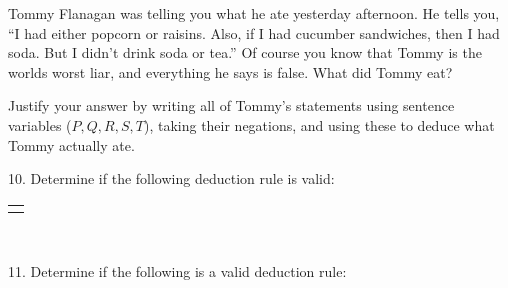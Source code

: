 \documentclass[12pt,]{book}
\theoremstyle{plain}
\theoremstyle{definition}
\theoremstyle{definition}
\theoremstyle{definition}
\numberwithin{equation}{chapter}
\newcommand{\hrulethin}  {\noalign{\hrule height 0.04em}}
\newlength{\panelmax}
\begin{document}
\begin{exerciselist}
Tommy Flanagan was telling you what he ate yesterday afternoon. He tells you, ``I had either popcorn or raisins. Also, if I had cucumber sandwiches, then I had soda. But I didn't drink soda or tea.'' Of course you know that Tommy is the worlds worst liar, and everything he says is false. What did Tommy eat?%
\par
\hypertarget{p-1288}{}%
Justify your answer by writing all of Tommy's statements using sentence variables (\(P, Q, R, S, T\)), taking their negations, and using these to deduce what Tommy actually ate.%
\par\smallskip
\item[10.]\hypertarget{exercise-150}{}\hypertarget{p-1289}{}%
Determine if the following deduction rule is valid:%
{%
\setlength{\panelmax}{0pt}
\ifdefined\panelboxAtabular\else\newsavebox{\panelboxAtabular}\fi%
\savebox{\panelboxAtabular}{%
\raisebox{\depth}{\parbox{1\linewidth}{\centering\begin{tabular}{cc}
&\(P \vee Q\)\tabularnewline[0pt]
&\(\neg P\)\tabularnewline\hrulethin
\(\therefore\)&\(Q\)
\end{tabular}
}}}
\ifdefined\phAtabular\else\newlength{\phAtabular}\fi%
\setlength{\phAtabular}{\ht\panelboxAtabular+\dp\panelboxAtabular}
\settototalheight{\phAtabular}{\usebox{\panelboxAtabular}}
\setlength{\panelmax}{\maxof{\panelmax}{\phAtabular}}
\leavevmode%
\setlength{\tabcolsep}{0\linewidth}
\par\medskip\noindent
\begin{tabular}{@{}*{1}{c}@{}}
\begin{minipage}[c][\panelmax][t]{1\linewidth}\usebox{\panelboxAtabular}\end{minipage}\end{tabular}\\
}%
\par\smallskip
\item[11.]\hypertarget{exercise-151}{}\hypertarget{p-1291}{}%
Determine if the following is a valid deduction rule:%
{%
\setlength{\panelmax}{0pt}
}
\end{exerciselist}
\end{document}
